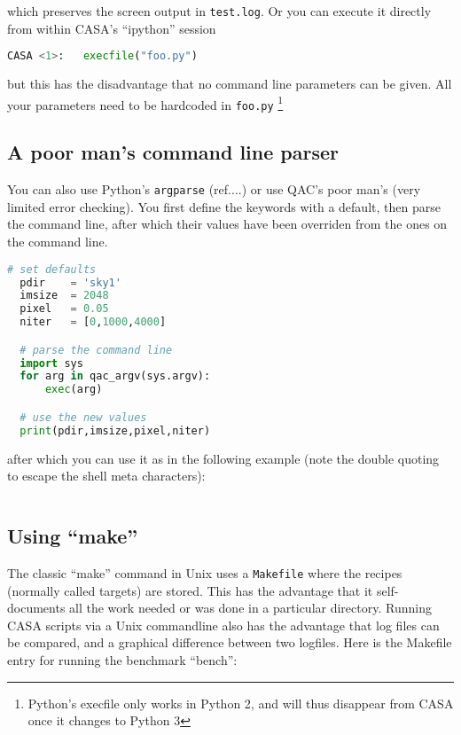 \documentclass[12pt,a4paper]{article}
\begin{document}
which preserves the screen output in \verb+test.log+.  Or you can execute it directly from within CASA's ``ipython'' session

\begin{lstlisting}[language=Python]
CASA <1>:   execfile("foo.py")
\end{lstlisting}

but this has the disadvantage that no command line parameters can be given. All your parameters need to be hardcoded
in \verb+foo.py+ \footnote{Python's execfile only works in Python 2, and will thus disappear from CASA once it changes to Python 3}

\subsection{A poor man's command line parser}

You can also use Python's {\tt argparse}   (ref....) or use QAC's poor man's (very limited error checking).  You first define
the keywords with a default, then parse the command line, after which their values have been overriden from the ones on
the command line.

\begin{lstlisting}[language=Python]
  # set defaults
  pdir    = 'sky1'
  imsize  = 2048
  pixel   = 0.05
  niter   = [0,1000,4000]

  # parse the command line
  import sys
  for arg in qac_argv(sys.argv):   
      exec(arg)

  # use the new values
  print(pdir,imsize,pixel,niter)

\end{lstlisting}

after which you can use it as in the following example (note the double quoting to escape the shell meta characters):

\begin{lstlisting}[language=bash]
  % casa --nogui -c foo.py pdir='"test1"' imsize=1024 pixel=0.1 niter='[0,1000]'  > test1.log 2>&1
\end{lstlisting}

\subsection{Using ``make''}

The classic ``make'' command in Unix uses a \verb+Makefile+ where the recipes (normally called targets) are stored. This has the advantage that
it self-documents all the work needed or was done in a particular directory. Running CASA scripts via a Unix commandline also has the
advantage that log files can be compared, and a  graphical difference between two logfiles.
Here is the Makefile entry for running the benchmark ``bench'':
\end{document}
